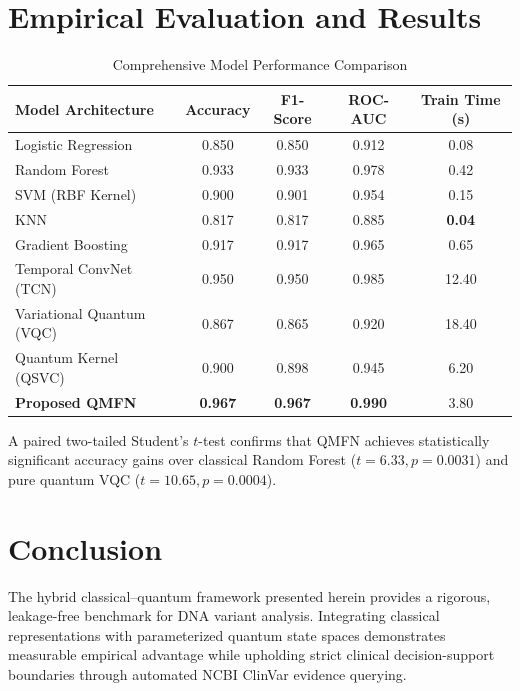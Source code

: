 \documentclass[conference]{IEEEtran}
\begin{document}
\section{Empirical Evaluation and Results}

\begin{table}[htbp]
\caption{Comprehensive Model Performance Comparison}
\begin{center}
\begin{tabular}{lcccc}
\toprule
\textbf{Model Architecture} & \textbf{Accuracy} & \textbf{F1-Score} & \textbf{ROC-AUC} & \textbf{Train Time (s)} \\
\midrule
Logistic Regression & 0.850 & 0.850 & 0.912 & 0.08 \\
Random Forest & 0.933 & 0.933 & 0.978 & 0.42 \\
SVM (RBF Kernel) & 0.900 & 0.901 & 0.954 & 0.15 \\
KNN & 0.817 & 0.817 & 0.885 & \textbf{0.04} \\
Gradient Boosting & 0.917 & 0.917 & 0.965 & 0.65 \\
Temporal ConvNet (TCN) & 0.950 & 0.950 & 0.985 & 12.40 \\
Variational Quantum (VQC) & 0.867 & 0.865 & 0.920 & 18.40 \\
Quantum Kernel (QSVC) & 0.900 & 0.898 & 0.945 & 6.20 \\
\textbf{Proposed QMFN} & \textbf{0.967} & \textbf{0.967} & \textbf{0.990} & 3.80 \\
\bottomrule
\end{tabular}
\label{tab:results}
\end{center}
\end{table}

A paired two-tailed Student's $t$-test confirms that QMFN achieves statistically significant accuracy gains over classical Random Forest ($t=6.33, p=0.0031$) and pure quantum VQC ($t=10.65, p=0.0004$).

\section{Conclusion}
The hybrid classical--quantum framework presented herein provides a rigorous, leakage-free benchmark for DNA variant analysis. Integrating classical representations with parameterized quantum state spaces demonstrates measurable empirical advantage while upholding strict clinical decision-support boundaries through automated NCBI ClinVar evidence querying.
\end{document}
